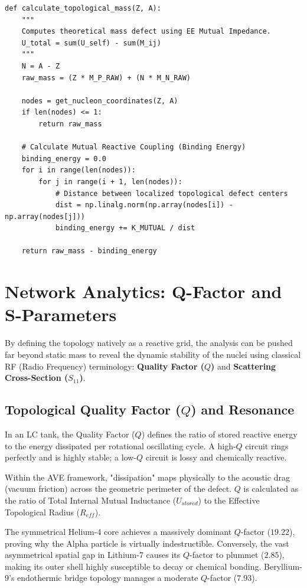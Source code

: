\begin{verbatim}
def calculate_topological_mass(Z, A):
    """
    Computes theoretical mass defect using EE Mutual Impedance.
    U_total = sum(U_self) - sum(M_ij)
    """
    N = A - Z
    raw_mass = (Z * M_P_RAW) + (N * M_N_RAW)
    
    nodes = get_nucleon_coordinates(Z, A)
    if len(nodes) <= 1:
        return raw_mass
        
    # Calculate Mutual Reactive Coupling (Binding Energy)
    binding_energy = 0.0
    for i in range(len(nodes)):
        for j in range(i + 1, len(nodes)):
            # Distance between localized topological defect centers
            dist = np.linalg.norm(np.array(nodes[i]) - np.array(nodes[j]))
            binding_energy += K_MUTUAL / dist
            
    return raw_mass - binding_energy
\end{verbatim}

\section{Network Analytics: Q-Factor and S-Parameters}
By defining the topology natively as a reactive grid, the analysis can be pushed far beyond static mass to reveal the dynamic stability of the nuclei using classical RF (Radio Frequency) terminology: \textbf{Quality Factor ($Q$)} and \textbf{Scattering Cross-Section ($S_{11}$)}.

\subsection{Topological Quality Factor ($Q$) and Resonance}
In an LC tank, the Quality Factor ($Q$) defines the ratio of stored reactive energy to the energy dissipated per rotational oscillating cycle. A high-$Q$ circuit rings perfectly and is highly stable; a low-$Q$ circuit is lossy and chemically reactive. 

Within the AVE framework, "dissipation" maps physically to the acoustic drag (vacuum friction) across the geometric perimeter of the defect. $Q$ is calculated as the ratio of Total Internal Mutual Inductance ($U_{stored}$) to the Effective Topological Radius ($R_{eff}$).

The symmetrical Helium-4 core achieves a massively dominant $Q$-factor ($19.22$), proving why the Alpha particle is virtually indestructible. Conversely, the vast asymmetrical spatial gap in Lithium-7 causes its $Q$-factor to plummet ($2.85$), making its outer shell highly susceptible to decay or chemical bonding. Beryllium-9's endothermic bridge topology manages a moderate $Q$-factor ($7.93$).

